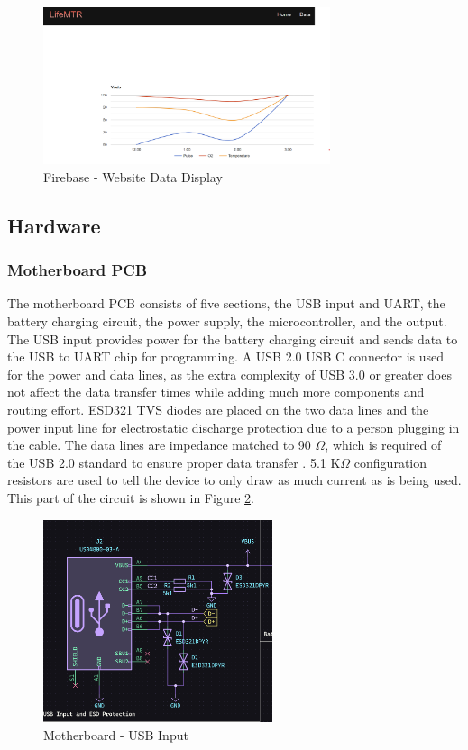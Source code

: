 \documentclass[12pt]{article}
\begin{document}
    \begin{figure}[ht]
        \centering
        \includegraphics[width=0.75\textwidth]{images/fb_data.png}
        \caption{Firebase - Website Data Display}
        \label{fb_data}
    \end{figure} 

\subsection{Hardware}
\subsubsection{Motherboard PCB}
    The motherboard PCB consists of five sections, the USB input and UART, the battery charging circuit, the power supply, the microcontroller, and the output. The USB input provides power for the battery charging circuit and sends data to the USB to UART chip for programming. A USB 2.0 USB C connector is used for the power and data lines, as the extra complexity of USB 3.0 or greater does not affect the data transfer times while adding much more components and routing effort. ESD321 TVS diodes are placed on the two data lines and the power input line for electrostatic discharge protection due to a person plugging in the cable. The data lines are impedance matched to 90 $\Omega$, which is required of the USB 2.0 standard to ensure proper data transfer \cite{usb_spec}. 5.1 K$\Omega$ configuration resistors are used to tell the device to only draw as much current as is being used. This part of the circuit is shown in Figure \ref{pcb_usb}.

    \begin{figure}[ht]
        \centering
        \includegraphics[width=0.6\textwidth]{images/pcb_usb.png}
        \caption{Motherboard - USB Input}
        \label{pcb_usb}
    \end{figure}
\end{document}
